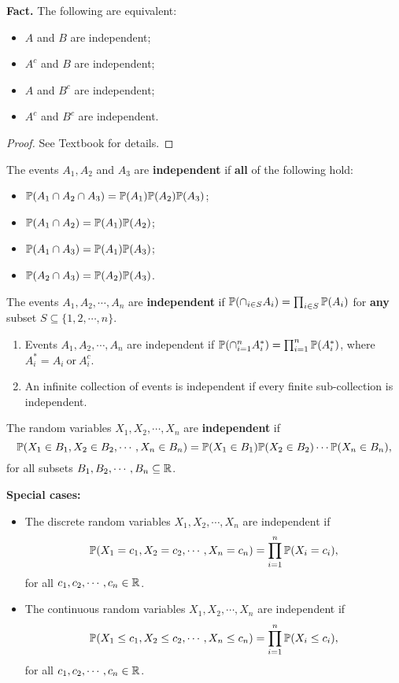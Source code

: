\textbf{Fact.} The following are equivalent:
\begin{itemize}
\item $A$ and $B$ are independent;
\item $A^c$ and $B$ are independent;
\item $A$ and $B^c$ are independent;
  \item $A^c$ and $B^c$ are independent.
\end{itemize}
\begin{proof}
  See Textbook for details.
\end{proof}
\begin{definition}
  The events $A_1, A_2$ and $A_3$ are \textbf{independent} if \textbf{all} of the
  following hold:
  \begin{itemize}
  \item $\mathbb{P}(A_1\cap A_2 \cap A_3) = \mathbb{P}(A_1)\mathbb{P}(A_2)\mathbb{P}(A_3)$;
  \item $\mathbb{P}(A_1\cap A_2) = \mathbb{P}(A_1)\mathbb{P}(A_2)$;
  \item $\mathbb{P}(A_1\cap A_3) = \mathbb{P}(A_1)\mathbb{P}(A_3)$;
  \item $\mathbb{P}(A_2\cap A_3) = \mathbb{P}(A_2)\mathbb{P}(A_3)$.
  \end{itemize}
  The events $A_1, A_2,\cdots, A_n$ are \textbf{independent} if $\mathbb{P}(\cap_{i\in S} A_i) =
  \prod_{i\in S}\mathbb{P}(A_i)$ for \textbf{any} subset $S\subseteq \{1, 2,\cdots, n\}$.
\end{definition}
\begin{remark}
 \begin{enumerate}[(1)]
 \item Events $A_1, A_2,\cdots, A_n$ are independent if $\mathbb{P}(\cap_{i=1}^n
   A_i^\ast) = \prod_{i=1}^n \mathbb{P}(A_i^\ast)$, where $A_i^\ast = A_i~ \text{or}~A_i^c$.
 \item An infinite collection of events is independent if every finite
   sub-collection is independent.
 \end{enumerate} 
\end{remark}
\begin{definition}
  The random variables $X_1, X_2,\cdots,X_n$ are \textbf{independent} if
  \[
    \mathbb{P}(X_1\in B_1, X_2\in B_2, \cdots, X_n\in B_n) = \mathbb{P}(X_1\in B_1)\mathbb{P}(X_2\in
    B_2)\cdots \mathbb{P}(X_n\in B_n),
  \]
  for all subsets $B_1, B_2, \cdots, B_n \subseteq \mathbb{R}$.
\end{definition}
\textbf{Special cases:}
\begin{itemize}
\item The discrete random variables $X_1, X_2, \cdots, X_n$ are independent if
  \[
    \mathbb{P}(X_1 =c_1, X_2=c_2, \cdots, X_n = c_n) = \prod_{i=1}^n \mathbb{P}(X_i = c_i),
  \]
  for all $c_1, c_2, \cdots, c_n\in \mathbb{R}$.
\item The continuous random variables $X_1, X_2, \cdots, X_n$ are independent if
  \[
    \mathbb{P}(X_1 \le c_1, X_2\le c_2, \cdots, X_n \le  c_n) = \prod_{i=1}^n \mathbb{P}(X_i \le c_i),
  \]
  for all $c_1, c_2, \cdots, c_n\in \mathbb{R}$.
\end{itemize}
